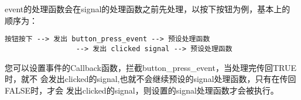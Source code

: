 event的处理函数会在signal的处理函数之前先处理，以按下按钮为例，基本上的
顺序为：
\begin{shell}
\begin{verbatim}
按钮按下 --> 发出 button_press_event --> 预设处理函数
                 --> 发出 clicked signal --> 预设处理函数
\end{verbatim}
\end{shell}

您可以设置事件的Callback函数，拦截button\_press\_event，当处理完传回TRUE时，就不
会发出clicked的signal,也就不会继续预设的signal处理函数，只有在传回FALSE时，才会
发出clicked的signal，则设置的signal处理函数才会被执行。
